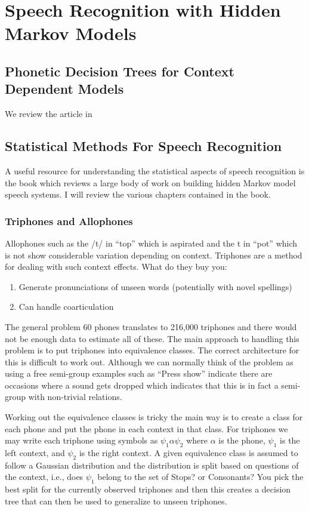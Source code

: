 \chapter{Speech Recognition with Hidden Markov Models}

\section{Phonetic Decision Trees for Context Dependent Models}
We review the article in \cite{young1994state}

\section{Statistical Methods For Speech Recognition}

A useful resource for understanding the statistical aspects of speech recognition is 
the book \cite{frederick1997statistical} which reviews a large body of work
on building hidden Markov model speech systems.  I will review the various
chapters contained in the book.

\subsection{Triphones and Allophones}

Allophones such as the /t/ in ``top'' which is aspirated and the t in ``pot'' which is
not  show considerable variation depending on context.  Triphones are a method for dealing
with such context effects.  What do they buy you:
\begin{enumerate}
\item  Generate pronunciations of unseen words (potentially with novel spellings)
\item  Can handle coarticulation
\end{enumerate}


The general problem 60 phones translates to 216,000 triphones and there would not be
enough data to estimate all of these. The main approach to handling this problem
is to put triphones into equivalence classes.  The correct architecture for this is difficult
to work out.  Although we can normally think of the problem as using a free semi-group
examples such as ``Press show'' indicate there are occasions where a sound gets dropped
which indicates that this is in fact a semi-group with non-trivial relations.

Working out the equivalence classes is tricky the main way is to create a class for each phone
and put the phone in each context in that class. For triphones we may write each triphone
using symbols as $\psi_1 \alpha \psi_2$ where $\alpha$ is the phone, $\psi_1$ is the left context,
and $\psi_2$ is the right context.  A given equivalence class is assumed to follow a Gaussian
distribution and the distribution is split based on questions of the context, i.e., does $\psi_1$
belong to the set of Stops? or Consonants? You pick the best split for the currently observed triphones
and then this creates a decision tree that can then be used to generalize to unseen triphones.


